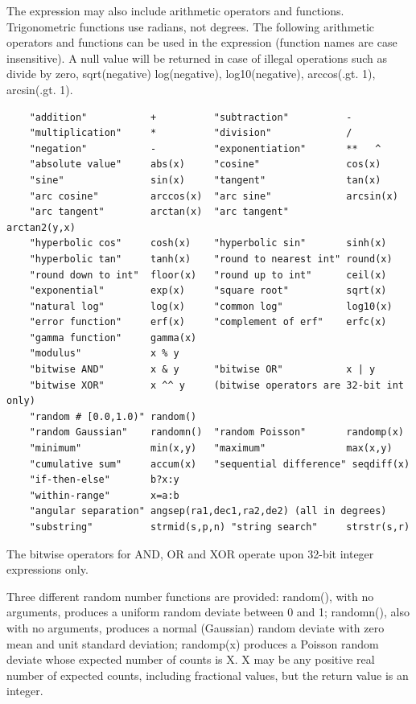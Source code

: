 \documentclass[11pt]{book}
\begin{document}
The expression may  also include arithmetic operators and functions.
Trigonometric  functions use  radians,  not degrees.  The  following
arithmetic  operators and  functions  can be  used in the expression
(function names are case insensitive).  A null value will be returned
in case of illegal operations such as divide by zero, sqrt(negative)
log(negative), log10(negative), arccos(.gt. 1), arcsin(.gt. 1).

\begin{verbatim}
    "addition"           +          "subtraction"          -
    "multiplication"     *          "division"             /
    "negation"           -          "exponentiation"       **   ^
    "absolute value"     abs(x)     "cosine"               cos(x)
    "sine"               sin(x)     "tangent"              tan(x)
    "arc cosine"         arccos(x)  "arc sine"             arcsin(x)
    "arc tangent"        arctan(x)  "arc tangent"          arctan2(y,x)
    "hyperbolic cos"     cosh(x)    "hyperbolic sin"       sinh(x)
    "hyperbolic tan"     tanh(x)    "round to nearest int" round(x)
    "round down to int"  floor(x)   "round up to int"      ceil(x)
    "exponential"        exp(x)     "square root"          sqrt(x)
    "natural log"        log(x)     "common log"           log10(x)
    "error function"     erf(x)     "complement of erf"    erfc(x)
    "gamma function"     gamma(x)
    "modulus"            x % y      
    "bitwise AND"        x & y      "bitwise OR"           x | y
    "bitwise XOR"        x ^^ y     (bitwise operators are 32-bit int only)
    "random # [0.0,1.0)" random()
    "random Gaussian"    randomn()  "random Poisson"       randomp(x)
    "minimum"            min(x,y)   "maximum"              max(x,y)
    "cumulative sum"     accum(x)   "sequential difference" seqdiff(x)
    "if-then-else"       b?x:y
    "within-range"       x=a:b
    "angular separation" angsep(ra1,dec1,ra2,de2) (all in degrees)
    "substring"          strmid(s,p,n) "string search"     strstr(s,r)
\end{verbatim}
The bitwise operators for AND, OR and XOR operate upon 32-bit integer 
expressions only.

Three different random number functions are provided: random(), with
no arguments, produces a uniform random deviate between 0 and 1;
randomn(), also with no arguments, produces a normal (Gaussian) random
deviate with zero mean and unit standard deviation; randomp(x)
produces a Poisson random deviate whose expected number of counts is
X.  X may be any positive real number of expected counts, including
fractional values, but the return value is an integer.
\end{document}

